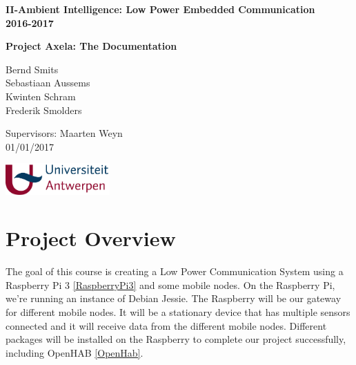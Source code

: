 \documentclass[a4paper,notitlepage]{article}
\begin{document}
\begin{titlepage}
    \centering
    \vfill
    {\bfseries\Large
        II-Ambient Intelligence: Low Power Embedded Communication\\2016-2017\\
        
    } 
    
    \hrulefill
    \vskip4cm
    
    {\bfseries\large
            Project Axela: The Documentation\\
            \vskip2cm
            
            Bernd Smits\\
            Sebastiaan Aussems\\
            Kwinten Schram\\
            Frederik Smolders\\
            \vskip2cm           
    }   
    {\bfseries   
            
            Supervisors: Maarten Weyn\\
           	01/01/2017   
            
            
            
            
    } 
    
    \vfill
    \includegraphics[width=4cm]{images/logo_UA_hor_kl_PMS.pdf}     
\end{titlepage}

\tableofcontents
\vfill
\newpage


\section*{Project Overview}

The goal of this course is creating a Low Power Communication System using a Raspberry Pi 3 \ref{RaspberryPi3} and some mobile nodes. On the Raspberry Pi, we're running an instance of Debian Jessie. The Raspberry will be our gateway for different mobile nodes. It will be a stationary device that has multiple sensors connected and it will receive data from the different mobile nodes. Different packages will be installed on the Raspberry to complete our project successfully, including OpenHAB \ref{OpenHab}.\\
\end{document}
